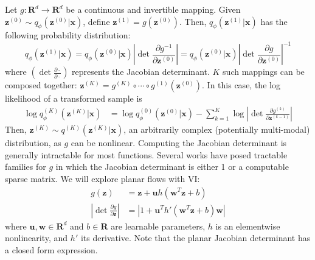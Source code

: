 Let $g: \mathbf{R}^d \rightarrow \mathbf{R}^d$ be a continuous and invertible mapping.
Given $\mathbf{z}^{(0)} \sim q_\phi(\mathbf{z}^{(0)}|\mathbf{x})$, define $\mathbf{z}^{(1)} = g(\mathbf{z}^{(0)})$.
Then, $q_\phi(\mathbf{z}^{(1)}|\mathbf{x})$ has the following probability distribution:
\begin{equation}
    q_\phi(\mathbf{z}^{(1)}|\mathbf{x}) = q_\phi(\mathbf{z}^{(0)}|\mathbf{x})\left|\det \frac{\partial g^{-1}}{\partial \mathbf{z}^{(0)}}\right| = q_\phi(\mathbf{z}^{(0)}|\mathbf{x})\left|\det \frac{\partial g}{\partial \mathbf{z}^{(0)}}\right|^{-1}
    \label{eq:flow1}
\end{equation}
where $\left( \det \frac{\partial\cdot}{\partial\cdot} \right)$ represents the Jacobian determinant.
$K$ such mappings can be composed together: $\mathbf{z}^{(K)} = g^{(K)} \circ \cdots \circ g^{(1)}(\mathbf{z}^{(0)})$. In this case, the log likelihood of a transformed sample is
\begin{align*}
    \log q^{(K)}_\phi(\mathbf{z}^{(K)}|\mathbf{x}) &= \log q^{(0)}_\phi(\mathbf{z}^{(0)}|\mathbf{x}) - \sum_{k=1}^K \log \left| \det \frac{\partial g^{(k)}}{ \partial \mathbf{z}^{(k-1)}} \right|
\end{align*}
Then, $\mathbf{z}^{(K)} \sim q^{(K)}(\mathbf{z}^{(K)}|\mathbf{x})$, an arbitrarily complex (potentially multi-modal) distribution, as $g$ can be nonlinear.
Computing the Jacobian determinant is generally intractable for most functions.
Several works \cite{rezende2015variational,tomczak2016improving,berg2018sylvester}  have posed tractable families for $g$ in which the Jacobian determinant is either 1 or a computable sparse matrix.
We will explore planar flows \cite{rezende2015variational} with VI:
\begin{align}
    g(\mathbf{z}) &= \mathbf{z} + \mathbf{u} h(\mathbf{w}^T \mathbf{z} + b) \\
    \left|\det \frac{\partial g}{\partial \mathbf{z}}\right| &= \left| 1 + \mathbf{u}^T h'(\mathbf{w}^T\mathbf{z} + b)\mathbf{w} \right|
    \label{eq:flow2}
\end{align}
where $\mathbf{u},\mathbf{w} \in \mathbf{R}^d$ and $b\in \mathbf{R}$ are learnable parameters, $h$ is an elementwise nonlinearity, and $h'$ its derivative.
Note that the planar Jacobian determinant has a closed form expression.

